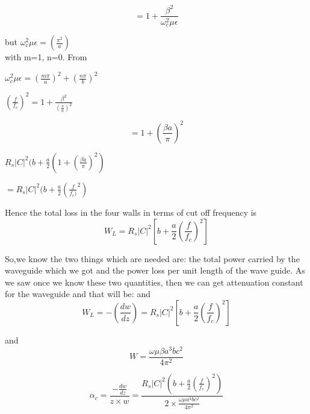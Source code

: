 \begin{equation}
= 1+ \frac{\beta^2}{\omega_c^2\mu\epsilon}	
\end{equation}



but $\omega_c^2\mu\epsilon=(\frac{\pi^2}{a})$\\ with  m=1, n=0. From 
\begin{center}
	$\omega_c^2\mu\epsilon=(\frac{m\pi}{a})^2 + (\frac{n\pi}{b})^2$	
\end{center}

\begin{center}
	$(\frac{f}{f_c})^2= 1+\frac{\beta^2}{(\frac{\pi}{a})^2}$	
\end{center}

\begin{equation}
=1+ (\frac{\beta a}{\pi})^2	
\end{equation}
\begin{center}
	$R_s|C|^2 (b+\frac{a}{2}(1+(\frac{\beta a}{\pi})^2)$	
\end{center}
\begin{center}
	$=R_s|C|^2(b+\frac{a}{2}(\frac{f}{f_c)}^2)$	
\end{center}



Hence the total loss in the four walls in terms of cut off frequency is
\begin{equation}
W_L=R_s|C|^2[b+\frac{a}{2}(\frac{f}{f_c})^2]	
\end{equation}



So,we know the two things which are needed are: the total power carried by the waveguide which we got and the power loss per unit length of the wave guide. As we saw once we know these two quantities, then we can get attenuation  constant for the waveguide and that will be:
and 
\begin{equation}
W_L=-(\frac{dw}{dz})= R_s|C|^2[b+\frac{a}{2}(\frac{f}{f_c})^2]	
\end{equation}

and
\begin{equation}
W=\frac{\omega\mu\beta a^3bc^2}{4\pi^2}
\end{equation}


\begin{equation}
\alpha_{c}=\frac{-\frac{dw}{dz}}{z\times w}=\frac{R_s|C|^2(b+\frac{a}{2}(\frac{f}{f_c})^2)}{2\times\frac{\omega\mu a^3bc^2}{4\pi^2}}
\end{equation}


